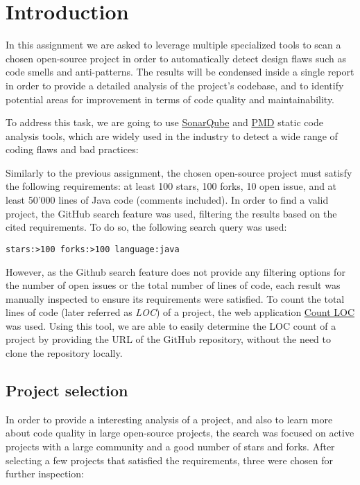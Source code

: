 \section{Introduction}

In this assignment we are asked to leverage multiple specialized tools to scan a chosen open-source project in order to automatically detect design flaws such as code smells and anti-patterns. The results will be condensed inside a single report in order to provide a detailed analysis of the project's codebase, and to identify potential areas for improvement in terms of code quality and maintainability.

To address this task, we are going to use \href{https://www.sonarqube.org}{SonarQube} and \href{https://pmd.github.io/}{PMD} static code analysis tools, which are widely used in the industry to detect a wide range of coding flaws and bad practices:

Similarly to the previous assignment, the chosen open-source project must satisfy the following requirements: at least 100 stars, 100 forks, 10 open issue, and at least 50'000 lines of Java code (comments included). In order to find a valid project, the GitHub search feature was used, filtering the results based on the cited requirements. To do so, the following search query was used:

\begin{lstlisting}[caption=GitHub search query]
                    stars:>100 forks:>100 language:java
\end{lstlisting}

\noindent However, as the Github search feature does not provide any filtering options for the number of open issues or the total number of lines of code, each result was manually inspected to ensure its requirements were satisfied. To count the total lines of code (later referred as \emph{LOC}) of a project, the web application \href{https://codetabs.com/count-loc/count-loc-online.html}{Count LOC} was used. Using this tool, we are able to easily determine the LOC count of a project by providing the URL of the GitHub repository, without the need to clone the repository locally.

\subsection{Project selection}

In order to provide a interesting analysis of a project, and also to learn more about code quality in large open-source projects, the search was focused on active projects with a large community and a good number of stars and forks. After selecting a few projects that satisfied the requirements, three were chosen for further inspection:

